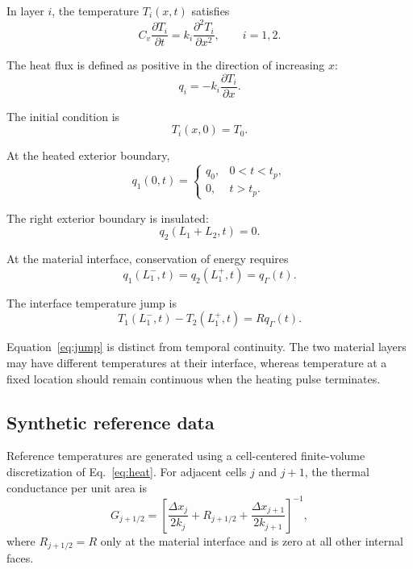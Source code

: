 \documentclass[11pt,a4paper]{article}
\begin{document}
In layer $i$, the temperature $T_i(x,t)$ satisfies
\begin{equation}
C_v\frac{\partial T_i}{\partial t}
=
k_i\frac{\partial^2T_i}{\partial x^2},
\qquad i=1,2.
\label{eq:heat}
\end{equation}

The heat flux is defined as positive in the direction of
increasing $x$:
\begin{equation}
q_i=-k_i\frac{\partial T_i}{\partial x}.
\label{eq:fourier}
\end{equation}

The initial condition is
\begin{equation}
T_i(x,0)=T_0.
\label{eq:initial}
\end{equation}

At the heated exterior boundary,
\begin{equation}
q_1(0,t)=
\begin{cases}
q_0, & 0<t<t_p,\\
0, & t>t_p.
\end{cases}
\label{eq:leftbc}
\end{equation}

The right exterior boundary is insulated:
\begin{equation}
q_2(L_1+L_2,t)=0.
\label{eq:rightbc}
\end{equation}

At the material interface, conservation of energy requires
\begin{equation}
q_1(L_1^{-},t)=q_2(L_1^{+},t)=q_\Gamma(t).
\label{eq:fluxcontinuity}
\end{equation}

The interface temperature jump is
\begin{equation}
T_1(L_1^{-},t)-T_2(L_1^{+},t)
=
R q_\Gamma(t).
\label{eq:jump}
\end{equation}

Equation~\eqref{eq:jump} is distinct from temporal continuity.
The two material layers may have different temperatures at
their interface, whereas temperature at a fixed location
should remain continuous when the heating pulse terminates.

\subsection{Synthetic reference data}

Reference temperatures are generated using a cell-centered
finite-volume discretization of Eq.~\eqref{eq:heat}.
For adjacent cells $j$ and $j+1$, the thermal conductance
per unit area is
\begin{equation}
G_{j+1/2}
=
\left[
\frac{\Delta x_j}{2k_j}
+
R_{j+1/2}
+
\frac{\Delta x_{j+1}}{2k_{j+1}}
\right]^{-1},
\label{eq:conductance}
\end{equation}
where $R_{j+1/2}=R$ only at the material interface and is
zero at all other internal faces.
\end{document}
